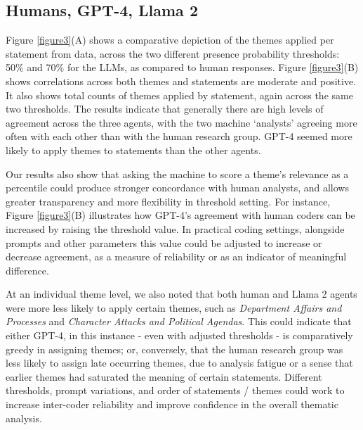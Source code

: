 \documentclass{article}
\begin{document}
\subsection{Humans, GPT-4, Llama 2}\label{humans-gpt-llama}

Figure \ref{figure3}(A) shows a comparative depiction of the themes applied per statement from data, across the two different presence probability thresholds: 50\% and 70\% for the LLMs, as compared to human responses. Figure \ref{figure3}(B) shows correlations across both themes and statements are moderate and positive. It also shows total counts of themes applied by statement, again across the same two thresholds. The results indicate that generally there are high levels of agreement across the three agents, with the two machine `analysts' agreeing more often with each other than with the human research group. GPT-4 seemed more likely to apply themes to statements than the other agents. 

Our results also show that asking the machine to score a theme's relevance as a percentile could produce stronger concordance with human analysts, and allows greater transparency and more flexibility in threshold setting. For instance, Figure \ref{figure3}(B) illustrates how GPT-4's agreement with human coders can be increased by raising the threshold value. In practical coding settings, alongside prompts and other parameters this value could be adjusted to increase or decrease agreement, as a measure of reliability or as an indicator of meaningful difference.

At an individual theme level, we also noted that both human and Llama 2 agents were more less likely to apply certain themes, such as \emph{Department Affairs and Processes} and \emph{Character Attacks and Political Agendas}. This could indicate that either GPT-4, in this instance - even with adjusted thresholds - is comparatively greedy in assigning themes; or, conversely, that the human research group was less likely to assign late occurring themes, due to analysis fatigue or a sense that earlier themes had saturated the meaning of certain statements. Different thresholds, prompt variations, and order of statements / themes could work to increase inter-coder reliability and improve confidence in the overall thematic analysis.
\end{document}
